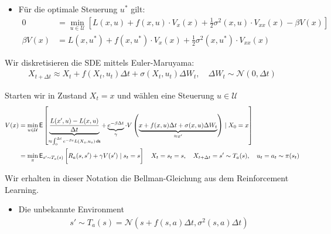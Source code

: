 \documentclass[a4paper, 12pt]{scrartcl}
\newcommand{\ds}{\thinspace \mathsf{ds}}
\begin{document}
\begin{beweis}
\begin{itemize}
        \item[5.] Für die optimale Steuerung $u^*$ gilt:
        \begin{align*}
            0 &= \min_{u \in \mathcal{U}} 
            \left[
                L(x,u) + f(x,u) \cdot V_x(x) + \frac{1}{2} \sigma^2(x,u) \cdot V_{xx}(x) 
                - \beta V(x)
            \right]
            \\
            \beta V(x) &= L(x,u^*) + f(x,u^*) \cdot V_x(x) + \frac{1}{2} \sigma^2(x,u^*) \cdot V_{xx}(x)
        \end{align*}
    \end{itemize}
\end{beweis}

\begin{beispiel}
    Wir diskretisieren die SDE mittels Euler-Maruyama:
    \begin{align*}
        X_{t+\Delta t} 
        \approx
        X_t + f(X_t,u_t) \Delta t + \sigma(X_t,u_t) \Delta W_t,
        \quad \Delta W_t \sim \mathcal{N}(0, \Delta t)
    \end{align*}

    Starten wir in Zustand $X_t = x$ und wählen eine Steuerung $u \in \mathcal{U}$
    \begin{align*}
        V(x) 
        &= 
        \min_{u \in \mathcal{U}}
        \mathsf{E}
        \left[
            \underbrace{
                \frac{L(x',u) - L(x,u)}{\Delta t}
            }_{
                \approx \int_{0}^{\Delta t} e^{-\beta s} L(X_s,u_s) \ds
            }
            + 
            \underbrace{
                e^{-\beta \Delta t}
            }_{
                \gamma
            }
            \cdot 
            V
            \left(
                \underbrace{
                    x+f(x,u) \Delta t + \sigma(x,u) \Delta W_t
                }_{\approx x'}
            \right)
            \mid X_0 = x
        \right]
        \\
        &=
        \min_{\pi}
        \mathsf{E}_{s' \sim T_a (s)}
        \left[
            \vphantom{\int}
            R_{a}(s,s') + \gamma V(s') \mid s_t = s
        \right]
        \quad
        X_t = s_t = s, 
        \quad
        X_{t+\Delta t} = s' \sim T_a (s),
        \quad
        u_t = a_t \sim \pi(s_t)
    \end{align*}

    Wir erhalten in dieser Notation die Bellman-Gleichung aus dem Reinforcement Learning. 
    \begin{itemize}
        \item Die unbekannte Environment 
        \begin{align*}
            s' \sim T_a (s)
            = \mathcal{N}
            \left(
                s + f(s,a) \Delta t, 
                \sigma^2(s,a) \Delta t
            \right)
        \end{align*}


\end{itemize}
\end{beispiel}
\end{document}
